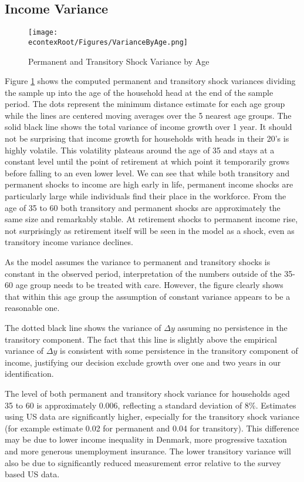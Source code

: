 \documentclass[titlepage]{\econtex}\newcommand{\texname}{IncomeUncertainty}
\begin{document}
\subsection{Income Variance} \label{inc_variance}
\begin{figure} 
\begin{centering}
	\texttt{[image: \\econtexRoot/Figures/VarianceByAge.png]} 
	\caption{Permanent and Transitory Shock Variance by Age}
	\label{fig:VarianceByAge}
\end{centering}
\end{figure}
Figure \ref{fig:VarianceByAge} shows the computed permanent and transitory shock variances dividing the sample up into the age of the household head at the end of the sample period. The dots represent the minimum distance estimate for each age group while the lines are centered moving averages over the 5 nearest age groups. The solid black line shows the total variance of income growth over 1 year. It should not be surprising that income growth for households with heads in their 20's is highly volatile. This volatility plateaus around the age of 35 and stays at a constant level until the point of retirement at which point it temporarily grows before falling to an even lower level. We can see that while both transitory and permanent shocks to income are high early in life, permanent income shocks are particularly large while individuals find their place in the workforce. From the age of 35 to 60 both transitory and permanent shocks are approximately the same size and remarkably stable. At retirement shocks to permanent income rise, not surprisingly as retirement itself will be seen in the model as a shock, even as transitory income variance declines.

As the model assumes the variance to permanent and transitory shocks is constant in the observed period, interpretation of the numbers outside of the 35-60 age group needs to be treated with care. However, the figure clearly shows that within this age group the assumption of constant variance appears to be a reasonable one.

The dotted black line shows the variance of $\Delta y$ assuming no persistence in the transitory component. The fact that this line is slightly above the empirical variance of $\Delta y$ is consistent with some persistence in the transitory component of income, justifying our decision exclude growth over one and two years in our identification.

The level of both permanent and transitory shock variance for households aged 35 to 60 is approximately 0.006, reflecting a standard deviation of 8\%. Estimates using US data are significantly higher, especially for the transitory shock variance (for example \cite{carroll_nature_1997} estimate 0.02 for permanent and 0.04 for transitory). This difference may be due to lower income inequality in Denmark, more progressive taxation and more generous unemployment insurance. The lower transitory variance will also be due to significantly reduced measurement error relative to the survey based US data. 
\end{document}
